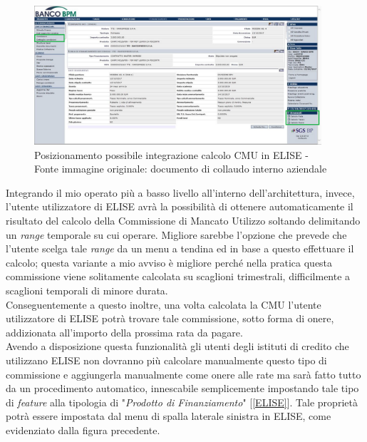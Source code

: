 	\begin{figure}[H]
		\centering
	   	\includegraphics[width=0.95\textwidth]{immagini/Elise_postCMU}
	   	\caption{Posizionamento possibile integrazione calcolo CMU in ELISE -\\ Fonte immagine originale: documento di collaudo interno aziendale}
	\end{figure}
	
	
	Integrando il mio operato più a basso livello all'interno dell'architettura, invece, l'utente utilizzatore di ELISE avrà la possibilità di ottenere automaticamente il risultato del calcolo della Commissione di Mancato Utilizzo soltando delimitando un \textit{range} temporale su cui operare. Migliore sarebbe l'opzione che prevede che l'utente scelga tale \textit{range} da un menu a tendina ed in base a questo effettuare il calcolo; questa variante a mio avviso è migliore perché nella pratica questa commissione viene solitamente calcolata su scaglioni trimestrali, difficilmente a scaglioni temporali di minore durata.\\
	
	Conseguentemente a questo inoltre, una volta calcolata la CMU l'utente utilizzatore di ELISE potrà trovare tale commissione, sotto forma di onere, addizionata all'importo della prossima rata da pagare.\\
	
	Avendo a disposizione questa funzionalità gli utenti degli istituti di credito che utilizzano ELISE non dovranno più calcolare manualmente questo tipo di commissione e aggiungerla manualmente come onere alle rate ma sarà fatto tutto da un procedimento automatico, innescabile semplicemente impostando tale tipo di \textit{feature} alla tipologia di "\textit{Prodotto di Finanziamento}" [\ref{ELISE}]. Tale proprietà potrà essere impostata dal menu di spalla laterale sinistra in ELISE, come evidenziato dalla figura precedente.